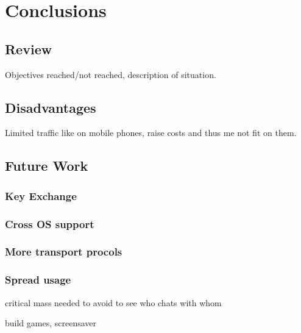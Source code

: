 \chapter{Conclusions}
\section{Review}
Objectives reached/not reached, description of situation.
\section{Disadvantages}
Limited traffic like on mobile phones, raise costs and thus me not
fit on them.
\section{Future Work}
\subsection{Key Exchange}
\subsection{Cross OS support}
\subsection{More transport procols}
\subsection{Spread usage}
critical mass needed to avoid to see who chats with whom

build games, screensaver
